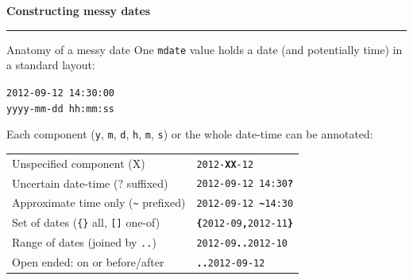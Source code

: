 \documentclass[9pt]{extarticle}
\let\code\verb
\newcommand{\colhead}[2]{%
  {\color{mdbrown}\bfseries\large #1\; #2}\\[-4pt]
  {\color{mddark}\rule{\linewidth}{1.2pt}}\vspace{1pt}}
\begin{document}
\begin{minipage}[t]{0.323\textwidth}
\colhead{\faCalendarPlus}{Constructing messy dates}

\begin{greybox}{Anatomy of a messy date}
One \code|mdate| value holds a date (and potentially time) in a standard layout:
\begin{center}
\code|2012-09-12 14:30:00|\\[-2pt]
{\color{mdgreyd}\code|yyyy-mm-dd hh:mm:ss|}
\end{center}
Each component ({\color{mdgreyd}\code|y|, \code|m|, \code|d|, \code|h|, \code|m|, \code|s|}) or the whole date-time can be annotated:

\smallskip
\begin{center}
\renewcommand{\arraystretch}{1.12}
\begin{tabular}{@{}ll@{}}
Unspecified component (X) & \texttt{2012-\textbf{XX}-12}\\
Uncertain date-time (? suffixed) & \texttt{2012-09-12 14:30\textbf{?}}\\
Approximate time only (\code|~| prefixed) & \texttt{2012-09-12 \textbf{\textasciitilde}14:30}\\
Set of dates (\code|{}| all, \code|[]| one-of) & \texttt{\textbf{\{}2012-09\textbf{,}2012-11\textbf{\}}}\\
Range of dates (joined by \code|..|) & \texttt{2012-09\textbf{..}2012-10}\\
Open ended: on or before/after & \texttt{\textbf{..}2012-09-12}\\
\end{tabular}
\end{center}
\end{greybox}


\end{minipage}
\end{document}
